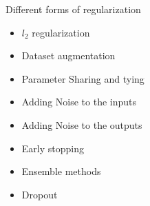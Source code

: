 \begin{frame}
	\vspace{4em}
	\begin{overlayarea}{\textwidth}{\textheight}
		\begin{block}{Different forms of regularization}
			\begin{itemize}
				\item<1-> $l_2$ regularization
				\item<2-> Dataset augmentation
				\item<3-> Parameter Sharing and tying
				\item<4-> Adding Noise to the inputs 
				\item<5-> Adding Noise to the outputs
				\item<6-> Early stopping
				\item<7-> Ensemble methods
				\item<8-> Dropout
			\end{itemize}
		\end{block}
	\end{overlayarea}
\end{frame}
